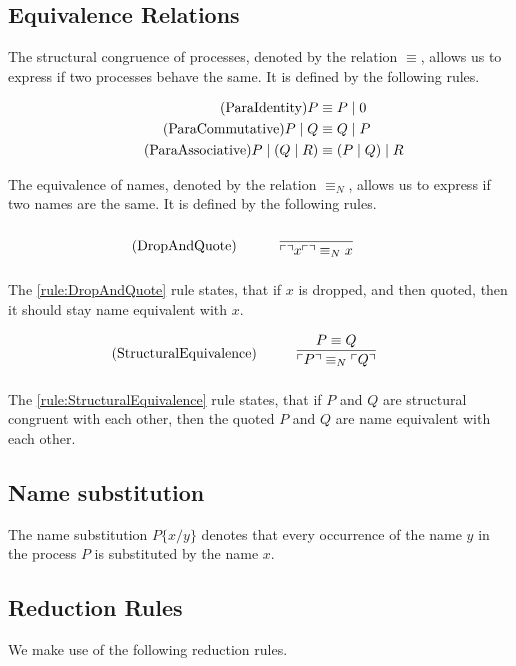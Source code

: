 \subsection{Equivalence Relations}
The structural congruence of processes, denoted by the relation $\equiv$, allows us to express if two processes behave the same. It is defined by the following rules.

\begin{align*}
	\tag{ParaIdentity}P&\equiv P\mid 0\\
    \tag{ParaCommutative}P\mid Q &\equiv Q\mid P\\
    \tag{ParaAssociative}P\mid (Q\mid R)&\equiv (P\mid Q)\mid R
\end{align*}


\FloatBarrier

The equivalence of names, denoted by the relation $\equiv _N$, allows us to express if two names are the same. It is defined by the following rules. 

\begin{align}
	\tag{DropAndQuote}\label{rule:DropAndQuote}\infrule{}{\quot{\drop{x}}\equiv _N x}
\end{align}

\noindent
The \ref{rule:DropAndQuote} rule states, that if $x$ is dropped, and then quoted, then it should stay name equivalent with $x$.

\begin{align}
	\tag{StructuralEquivalence}\label{rule:StructuralEquivalence}\infrule{P\equiv Q}{\quot{P} \equiv _N \quot{Q}}
\end{align}

\noindent
The \ref{rule:StructuralEquivalence} rule states, that if $P$ and $Q$ are structural congruent with each other, then the quoted $P$ and $Q$ are name equivalent with each other.

\FloatBarrier

\subsection{Name substitution} The name substitution $P\{x/y\}$ denotes that every occurrence of the name $y$ in the process $P$ is substituted by the name $x$.

\subsection{Reduction Rules}
We make use of the following reduction rules.

